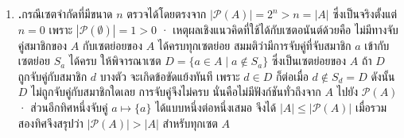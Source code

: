 \begin{enumerate}[resume*=anskey]
    \item \textbf{\thechapter.\theenumi}\quad กรณีเซตจำกัดที่มีขนาด $n$ ตรวจได้โดยตรงจาก $|\mathcal{P}(A)| = 2^n > n = |A|$ ซึ่งเป็นจริงตั้งแต่ $n = 0$ เพราะ $|\mathcal{P}(\emptyset)| = 1 > 0$ · เหตุผลเชิงแนวคิดที่ใช้ได้กับเซตอนันต์ด้วยคือ ไม่มีทางจับคู่สมาชิกของ $A$ กับเซตย่อยของ $A$ ได้ครบทุกเซตย่อย สมมติว่ามีการจับคู่ที่จับสมาชิก $a$ เข้ากับเซตย่อย $S_a$ ได้ครบ ให้พิจารณาเซต $D = \{a \in A \mid a \notin S_a\}$ ซึ่งเป็นเซตย่อยของ $A$ ถ้า $D$ ถูกจับคู่กับสมาชิก $d$ บางตัว จะเกิดข้อขัดแย้งทันที เพราะ $d \in D$ ก็ต่อเมื่อ $d \notin S_d = D$ ดังนั้น $D$ ไม่ถูกจับคู่กับสมาชิกใดเลย การจับคู่จึงไม่ครบ นั่นคือไม่มีฟังก์ชันทั่วถึงจาก $A$ ไปยัง $\mathcal{P}(A)$ · ส่วนอีกทิศหนึ่งจับคู่ $a \mapsto \{a\}$ ได้แบบหนึ่งต่อหนึ่งเสมอ จึงได้ $|A| \leq |\mathcal{P}(A)|$ เมื่อรวมสองทิศจึงสรุปว่า $|\mathcal{P}(A)| > |A|$ สำหรับทุกเซต $A$
\end{enumerate}

